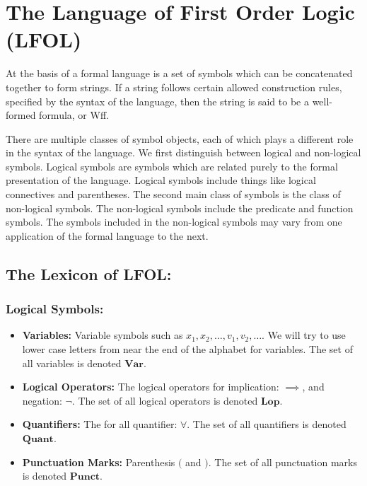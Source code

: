 \documentclass[12pt]{article}
\begin{document}
\newpage
\section{The Language of First Order Logic (LFOL)}

At the basis of a formal language is a set of symbols which can be concatenated together to form strings.
If a string follows certain allowed construction rules, specified by the syntax of the language, then the string is said to be a well-formed formula, or Wff.

There are multiple classes of symbol objects, each of which plays a different role in the syntax of the language. 
We first distinguish between logical and non-logical symbols. 
Logical symbols are symbols which are related purely to the formal presentation of the language.
Logical symbols include things like logical connectives and parentheses.
The second main class of symbols is the class of non-logical symbols.
The non-logical symbols include the predicate and function symbols.
The symbols included in the non-logical symbols may vary from one application of the formal language to the next.


\subsection{The Lexicon of LFOL:}

\hrulefill

\subsubsection*{Logical Symbols:}
\begin{itemize}
\item{\textbf{Variables:} Variable symbols such as $x_1, x_2, \ldots, v_1, v_2, \ldots$. We will try to use lower case letters from near the end of the alphabet for variables. The set of all variables is denoted $\textbf{Var}$.}
\item{\textbf{Logical Operators:} The logical operators for implication: $\implies$, and negation: $\lnot$. The set of all logical operators is denoted $\textbf{Lop}$.}
\item{\textbf{Quantifiers:} The for all quantifier: $\forall$. The set of all quantifiers is denoted $\textbf{Quant}$.}
\item{\textbf{Punctuation Marks:} Parenthesis $($ and $)$. The set of all punctuation marks is denoted $\textbf{Punct}$.}
\end{itemize}
\end{document}

